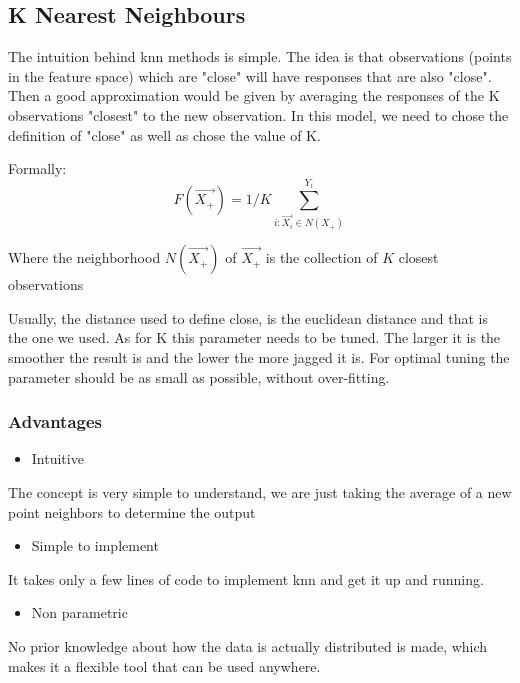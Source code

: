 \subsection{K Nearest Neighbours}
The intuition behind \acrshort{knn} methods is simple. The idea is that observations (points in the feature space) which are "close" will have responses that are also "close". Then a good approximation would be given by averaging the responses of the K observations "closest" to the new observation.
In this model, we need to chose the definition of "close" as well as chose the value of K.

Formally:
 $$
 F(\vec{X_+}) = 1/K \sum_{i:\vec{X_i} \in N(X_+)}^{Y_i}
 $$

Where the neighborhood $N(\vec{X_+})$ of $ \vec{X_+} $ is the collection of $K$ closest observations

Usually, the distance used to define close, is the euclidean distance and that is the one we used. As for K this parameter needs to be tuned. The larger it is the smoother the result is and the lower the more jagged it is. For optimal tuning the parameter should be as small as possible, without over-fitting.
\subsubsection{Advantages}
\begin{itemize}
\item Intuitive
\end{itemize}
The concept is very simple to understand, we are just taking the average of a new point neighbors to determine the output
\begin{itemize}
\item Simple to implement
\end{itemize}
It takes only a few lines of code to implement \acrshort{knn} and get it up and running.
\begin{itemize}
\item Non parametric
\end{itemize}
No prior knowledge about how the data is actually distributed is made, which makes it a flexible tool that can be used anywhere.

